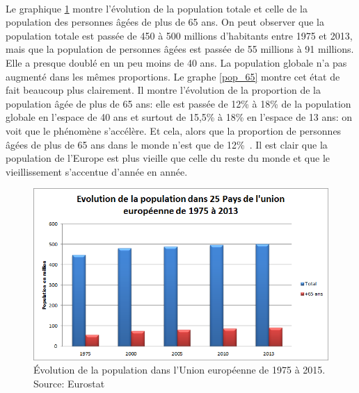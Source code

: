 \paragraph{}Le graphique \ref{eu_demo} montre l’évolution de la population totale et celle de la population des personnes âgées de plus de 65 ans. On peut observer que la population totale est passée de 450 à 500 millions d’habitants entre 1975 et 2013, mais que la population de personnes âgées est passée de 55 millions à 91 millions. Elle a presque doublé en un peu moins de 40 ans. La population globale n’a pas augmenté dans les mêmes proportions. Le graphe \ref{pop_65} montre cet état de fait beaucoup plus clairement. Il montre l’évolution de la proportion de la population âgée de plus de 65 ans: elle est passée de 12\% à 18\% de la population globale en l’espace de 40 ans et surtout de 15,5\% à 18\% en l’espace de 13 ans: on voit que le phénomène s'accélère.  Et cela, alors que la proportion de personnes âgées de plus de 65 ans dans le monde n’est que de 12\%~\citep{ined}. Il est clair que la population de l’Europe est plus vieille que celle du reste du monde et que le vieillissement s’accentue d’année en année. 


\begin{figure}[h!]
    \begin{center}
        \includegraphics[scale=0.7]{document/pop_eu.png}
        \caption{Évolution de la population dans l'Union européenne de 1975 à 2015. Source: Eurostat~\citep{eurostat_pop}}
        \label{eu_demo}
    \end{center}
\end{figure}



